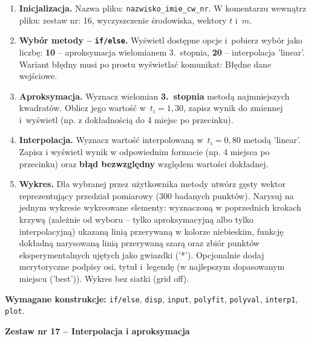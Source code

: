 \documentclass[a4paper,11pt]{article}
\begin{document}
\begin{enumerate}[leftmargin=*, label=\textbf{\arabic*.}, itemsep=2pt]

  \item \textbf{Inicjalizacja.}
    Nazwa pliku: \texttt{nazwisko\_imie\_cw\_nr}. W komentarzu wewnątrz pliku: zestaw nr: 16, wyczyszczenie środowiska, wektory $t$ i~$m$.

  \item \textbf{Wybór metody -- \texttt{if/else}.}
    Wyświetl dostępne opcje i~pobierz wybór jako liczbę: \textbf{10} -- aproksymacja wielomianem 3.~stopnia, \textbf{20} -- interpolacja 'linear'. Wariant błędny musi po prostu wyświetlać komunikat: Błędne dane wejściowe.

  \item \textbf{Aproksymacja.}
    Wyznacz wielomian \textbf{3.~stopnia} metodą najmniejszych kwadratów. Oblicz jego wartość w~$t_i = 1{,}30$, zapisz wynik do zmiennej i~wyświetl (np. z dokładnością do 4 miejsc po przecinku).

  \item \textbf{Interpolacja.}
    Wyznacz wartość interpolowaną w~$t_i = 0{,}80$ metodą 'linear'. Zapisz i wyświetl wynik w odpowiednim formacie (np. 4 miejsca po przecinku) oraz \textbf{błąd bezwzględny} względem wartości dokładnej.

  \item \textbf{Wykres.}
    Dla wybranej przez użytkownika metody utwórz gęsty wektor reprezentujący przedział pomiarowy (300 badanych punktów). Narysuj na jednym wykresie wykreowane elementy: wyznaczoną w poprzednich krokach krzywą (zależnie od wyboru -- tylko aproksymacyjną albo tylko interpolacyjną) ukazaną linią przerywaną w kolorze niebieskim, funkcję dokładną narysowaną linią przerywaną szarą oraz zbiór punktów eksperymentalnych ujętych jako gwiazdki ('*'). Opcjonalnie dodaj merytoryczne podpisy osi, tytuł i~legendę (w najlepszym dopasowanym miejscu ('best')). Wykres bez siatki (grid off).

\end{enumerate}

\vspace{0.3cm}
\begin{ramka}
\textbf{Wymagane konstrukcje:}
\texttt{if/else}, \texttt{disp}, \texttt{input}, \texttt{polyfit}, \texttt{polyval}, \texttt{interp1}, \texttt{plot}.
\end{ramka}

\clearpage
\begin{center}
  {\large\bfseries Zestaw nr 17 \quad -- \quad Interpolacja i aproksymacja}
\end{center}
\hrulefill
\vspace{0.4cm}
\end{document}
